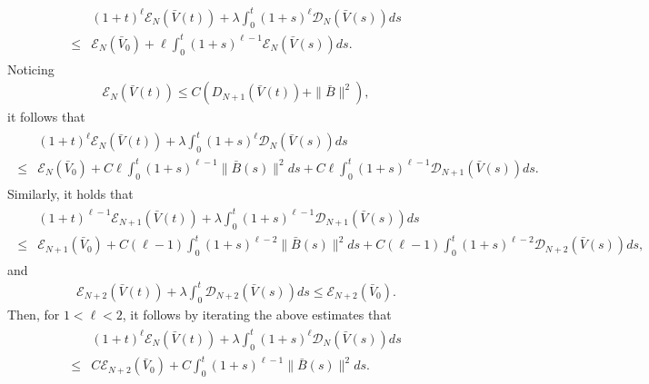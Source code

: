 \documentclass[11pt]{amsart}
\numberwithin{equation}{section}
\begin{document}
\begin{eqnarray*}
\begin{aligned}
 & (1+t)^{\ell}\mathcal {E}_{N}(\bar{V}(t))+\lambda
 \int_{0}^{t}(1+s)^{\ell}\mathcal {D}_{N}(\bar{V}(s))d s \\
 \leq & \mathcal {E}_{N}(\bar{V}_{0})+ \ell
 \int_{0}^{t}(1+s)^{\ell-1}\mathcal {E}_{N}(\bar{V}(s))d s.
\end{aligned}
\end{eqnarray*}
Noticing
\begin{eqnarray*}
  \mathcal {E}_{N}(\bar{V}(t))
  \leq C (D_{N+1}(\bar{V}(t))+\|
  \bar{B}\|^{2}),
\end{eqnarray*}
it follows that
\begin{eqnarray*}
\begin{aligned}
 & (1+t)^{\ell}\mathcal {E}_{N}(\bar{V}(t))+\lambda
 \int_{0}^{t}(1+s)^{\ell}\mathcal {D}_{N}(\bar{V}(s))d s \\
 \leq & \mathcal {E}_{N}(\bar{V}_{0})+ C \ell
 \int_{0}^{t}(1+s)^{\ell-1}\|
  \bar{B}(s)\|^{2}d s+ C\ell\int_{0}^{t}(1+s)^{\ell-1}\mathcal {D}_{N+1}(\bar{V}(s))d
  s.
\end{aligned}
\end{eqnarray*}
Similarly, it holds that
\begin{eqnarray*}
\begin{aligned}
 & (1+t)^{\ell-1}\mathcal {E}_{N+1}(\bar{V}(t))+\lambda
 \int_{0}^{t}(1+s)^{\ell-1}\mathcal {D}_{N+1}(\bar{V}(s))d s \\
 \leq & \mathcal {E}_{N+1}(\bar{V}_{0})+ C (\ell-1)
 \int_{0}^{t}(1+s)^{\ell-2}\|
  \bar{B}(s)\|^{2}ds
+ C(\ell-1)\int_{0}^{t}(1+s)^{\ell-2}\mathcal {D}_{N+2}(\bar{V}(s))d s,
\end{aligned}
\end{eqnarray*}
and
\begin{eqnarray*}
\mathcal {E}_{N+2}(\bar{V}(t))+\lambda \int_{0}^{t}\mathcal
{D}_{N+2}(\bar{V}(s))d s \leq \mathcal {E}_{N+2}(\bar{V}_{0}).
\end{eqnarray*}
Then, for $1<\ell<2$, it follows by iterating the above estimates
that
\begin{eqnarray}\label{sec5.ED}
\begin{aligned}
 & (1+t)^{\ell}\mathcal {E}_{N}(\bar{V}(t))+\lambda
 \int_{0}^{t}(1+s)^{\ell}\mathcal {D}_{N}(\bar{V}(s))d s \\
 \leq & C \mathcal {E}_{N+2}(\bar{V}_{0})+ C
 \int_{0}^{t}(1+s)^{\ell-1}\|
  \bar{B}(s)\|^{2}d s.
\end{aligned}
\end{eqnarray}
\end{document}
